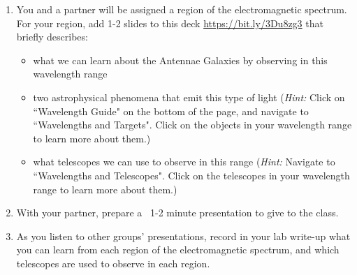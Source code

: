 \documentclass[11pt]{article}
\begin{document}
\begin{enumerate}
    \item You and a partner will be assigned a region of the electromagnetic spectrum.  For your region, add 1-2 slides to this deck \url{https://bit.ly/3Du8zg3} that briefly describes:
    \begin{itemize}
        \item what we can learn about the Antennae Galaxies by observing in this wavelength range
        \item two astrophysical phenomena that emit this type of light (\textit{Hint: }Click on ``Wavelength Guide" on the bottom of the page, and navigate to ``Wavelengths and Targets". Click on the objects in your wavelength range to learn more about them.)
        \item what telescopes we can use to observe in this range (\textit{Hint: }Navigate to ``Wavelengths and Telescopes". Click on the telescopes in your wavelength range to learn more about them.)
    \end{itemize} 
    \item With your partner, prepare a ~1-2 minute presentation to give to the class.
    \item As you listen to other groups' presentations, record in your lab write-up what you can learn from each region of the electromagnetic spectrum, and which telescopes are used to observe in each region.
\end{enumerate}

\end{document}
